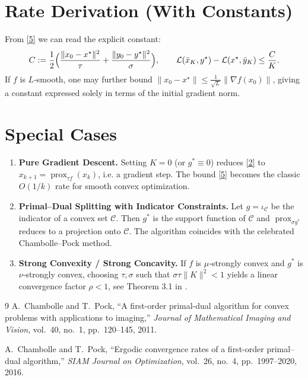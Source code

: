 \documentclass{article}
\newcommand{\prox}{\operatorname{prox}}
\begin{document}
\section*{Rate Derivation (With Constants)}
From \eqref{5} we can read the explicit constant:
\[
C:=\frac{1}{2}\Bigl(\frac{\|x_{0}-x^{\star}\|^{2}}{\tau}
+\frac{\|y_{0}-y^{\star}\|^{2}}{\sigma}\Bigr),
\qquad
\mathcal{L}(\bar{x}_{K},y^{\star})-\mathcal{L}(x^{\star},\bar{y}_{K})\le\frac{C}{K}.
\]
If $f$ is $L$‑smooth, one may further bound $\|x_{0}-x^{\star}\|\le\frac{1}{\sqrt{L}}\|\nabla f(x_{0})\|$, giving a constant expressed solely in terms of the initial gradient norm.

\section*{Special Cases}
\begin{enumerate}[noitemsep]
\item \textbf{Pure Gradient Descent.} Setting $K=0$ (or $g^{*}\equiv0$) reduces \eqref{2} to $x_{k+1}= \prox_{\tau f}(x_{k})$, i.e. a gradient step. The bound \eqref{5} becomes the classic $O(1/k)$ rate for smooth convex optimization.
\item \textbf{Primal–Dual Splitting with Indicator Constraints.} Let $g=\iota_{\mathcal{C}}$ be the indicator of a convex set $\mathcal{C}$. Then $g^{*}$ is the support function of $\mathcal{C}$ and $\prox_{\sigma g^{*}}$ reduces to a projection onto $\mathcal{C}$. The algorithm coincides with the celebrated Chambolle–Pock method.
\item \textbf{Strong Convexity / Strong Concavity.} If $f$ is $\mu$‑strongly convex and $g^{*}$ is $\nu$‑strongly convex, choosing $\tau,\sigma$ such that $\sigma\tau\|K\|^{2}<1$ yields a linear convergence factor $\rho<1$, see Theorem 3.1 in \cite{chambolle2016ergodic}.
\end{enumerate}

\begin{thebibliography}{9}
A.~Chambolle and T.~Pock, ``A first-order primal-dual algorithm for convex problems with applications to imaging,'' \emph{Journal of Mathematical Imaging and Vision}, vol.~40, no.~1, pp.~120--145, 2011.

A.~Chambolle and T.~Pock, ``Ergodic convergence rates of a first-order primal–dual algorithm,'' \emph{SIAM Journal on Optimization}, vol.~26, no.~4, pp.~1997--2020, 2016.
\end{thebibliography}
\end{document}
